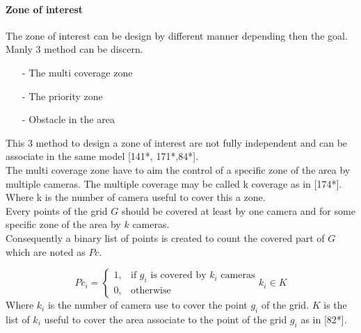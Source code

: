 \paragraph*{ Zone of interest } 
The zone of interest can be design by different manner depending then the goal. Manly 3 method can be discern.
\begin{itemize}
	\item[-]	The multi coverage zone 
	\item[-]	The priority zone  
	\item[-]	Obstacle in the area
\end{itemize}
 
This 3 method to design a zone of interest are not fully independent and can be associate in the same model [141*, 171*,84*].\\ 

The multi coverage zone have to aim the control of a specific zone of the area by multiple cameras.  The multiple coverage may be called k coverage as in [174*]. Where k is the number of camera useful to cover this a zone. \\
Every points of the grid $G$ should be covered at least by one camera and for some specific zone of the area by $k$ cameras.\\
 Consequently a binary list of points is created to count the covered part of $G$ which are noted as $Pc$.

\begin{equation}\label{eq:PciK}
Pc_i= \begin{cases} 1, & \mbox{if } g_i\mbox{ is covered by $k_i$ cameras} \\ 0, & \mbox{otherwise}   \end{cases}k_i \in K
\end{equation}
Where $k_i$ is the number of camera use to cover the point $g_i$ of the grid. $K $ is the list of $k_i$ useful to cover the area associate to the point of the grid $g_i$ as in [82*]. \\%

